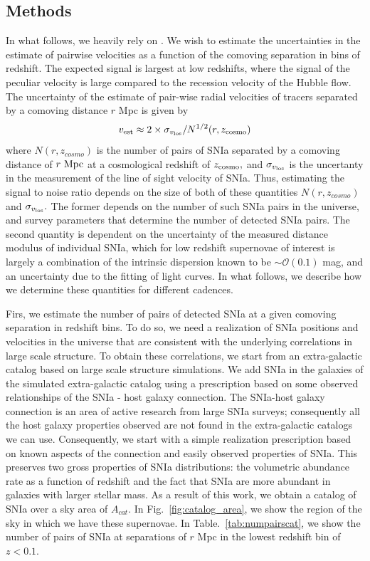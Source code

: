 \subsection{Methods}
In what follows, we heavily rely on \cite{2011PhRvD..83d3004B}. We wish to estimate the uncertainties in the estimate of pairwise velocities as a function of the comoving separation in bins of redshift. The expected signal is largest at low redshifts, where the signal of the peculiar velocity is large compared to the recession velocity of the Hubble flow.  The uncertainty of the estimate of pair-wise radial velocities of tracers separated by a comoving distance $r$ Mpc is given by
\begin{equation}
v_{\rm{est}} \approx 2 \times \sigma_{v_{\rm{los}}} / N^{1/2}(r, z_{\rm{cosmo}})
\end{equation}
where $N(r,z_{cosmo})$ is the number of pairs of SNIa separated by a comoving distance of $r~\rm{Mpc}$
at a cosmological redshift of $z_{\rm{cosmo}},$ and $\sigma_{v_{\rm{los}}}$ is the uncertanty in the
measurement of the line of sight velocity of SNIa. Thus, estimating the signal to noise ratio depends on the size of both of these quantities $N(r, z_{cosmo})$ and $\sigma_{v_{\rm{los}}}.$ The former depends on the number of such SNIa pairs in the universe, and  survey parameters that determine the number of detected SNIa pairs. The second quantity is dependent on the uncertainty of the measured distance modulus of individual SNIa, which for low redshift supernovae of interest is largely a combination of the intrinsic dispersion known to be $\sim \mathcal{O}(0.1)$ mag, and an uncertainty due to the fitting of light curves. In what follows, we describe how we determine these quantities for different cadences. 

Firs, we estimate the number of pairs of detected SNIa at a given comoving separation in redshift bins. To do so, we need a realization of SNIa positions and velocities in the universe that are consistent with the underlying correlations in large scale structure. To obtain these correlations, we start from an extra-galactic catalog based on large scale structure simulations. We add SNIa in the galaxies of the simulated extra-galactic catalog using a prescription based on some observed relationships of the SNIa - host galaxy connection. The SNIa-host galaxy connection is an area of active research from large SNIa surveys; consequently all the host galaxy properties observed are not found in the extra-galactic catalogs we can use. Consequently, we start with a simple realization prescription based on known aspects of the connection and easily observed properties of SNIa. This preserves two gross properties of SNIa distributions: the volumetric abundance rate as a function of redshift and the fact that SNIa are more abundant in galaxies with larger stellar mass. As a result of this work, we obtain a catalog of SNIa over a sky area of $A_{cat}.$ In Fig.~\ref{fig:catalog_area}, we show the region of the sky in which we have these supernovae. In Table.~\ref{tab:numpairscat}, we show the number of pairs of SNIa at separations of $r $ Mpc in the lowest redshift bin of $z < 0.1.$


